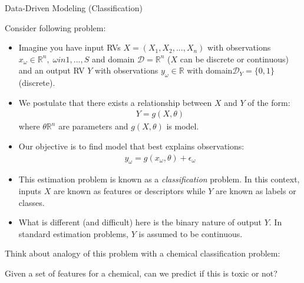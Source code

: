 \documentclass[9pt]{beamer}
\begin{document}
\begin{frame}{Data-Driven Modeling (Classification)}


Consider following problem:
\begin{itemize}
\item Imagine you have input RVs $X=(X_1,X_2,...,X_n)$ with observations $x_\omega\in \mathbb{R}^n,\; \omega in 1,...,S$ and domain $\mathcal{D}=\mathbb{R}^n$ ($X$ can be discrete or continuous) and an output RV $Y$ with observations $y_{\omega}\in \mathbb{R}$ with domain$\mathcal{D}_Y=\{0,1\}$ (discrete). 
 
\item We postulate that there exists a relationship between $X$ and $Y$ of the form:
\begin{align*}
Y=g(X,\theta)
\end{align*}
where $\theta \mathbb{R}^n$ are parameters and $g(X,\theta)$ is model.  

\item Our objective is to find model that best explains observations:
\begin{align*}
y_\omega=g(x_\omega,\theta)+\epsilon_\omega
\end{align*}
\item This estimation problem is known as a {\em classification} problem.  In this context, inputs $X$ are known as features or descriptors while $Y$ are known as labels or classes.  
\item What is different (and difficult) here is the binary nature of output $Y$. In standard estimation problems, $Y$ is assumed to be continuous. 

\end{itemize}

Think about analogy of this problem with a chemical classification problem: 
\begin{block}{}
Given a set of features for a chemical, can we predict if this is toxic or not? 
\end{block}


\end{frame}


\end{document}
